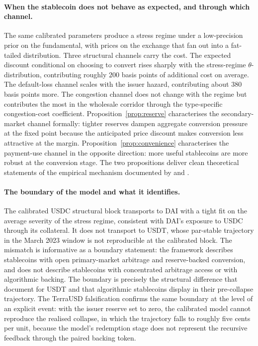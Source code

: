 \paragraph{When the stablecoin does not behave as expected, and through which channel.} The same calibrated parameters produce a stress regime under a low-precision prior on the fundamental, with prices on the exchange that fan out into a fat-tailed distribution. Three structural channels carry the cost. The expected discount conditional on choosing to convert rises sharply with the stress-regime $\theta$-distribution, contributing roughly $200$ basis points of additional cost on average. The default-loss channel scales with the issuer hazard, contributing about $380$ basis points more. The congestion channel does not change with the regime but contributes the most in the wholesale corridor through the type-specific congestion-cost coefficient. Proposition~\ref{prop:reserve} characterises the secondary-market channel formally: tighter reserves dampen aggregate conversion pressure at the fixed point because the anticipated price discount makes conversion less attractive at the margin. Proposition~\ref{prop:convenience} characterises the payment-use channel in the opposite direction: more useful stablecoins are more robust at the conversion stage. The two propositions deliver clean theoretical statements of the empirical mechanism documented by \citet{ma_zeng_zhang_2025} and \citet{bertsch_2025_adoption_fragility}.

\paragraph{The boundary of the model and what it identifies.} The calibrated USDC structural block transports to DAI with a tight fit on the average severity of the stress regime, consistent with DAI's exposure to USDC through its collateral. It does not transport to USDT, whose par-stable trajectory in the March 2023 window is not reproducible at the calibrated block. The mismatch is informative as a boundary statement: the framework describes stablecoins with open primary-market arbitrage and reserve-backed conversion, and does not describe stablecoins with concentrated arbitrage access or with algorithmic backing. The boundary is precisely the structural difference that \citet{ma_zeng_zhang_2025} document for USDT and that algorithmic stablecoins display in their pre-collapse trajectory. The TerraUSD falsification confirms the same boundary at the level of an explicit event: with the issuer reserve set to zero, the calibrated model cannot reproduce the realised collapse, in which the trajectory falls to roughly five cents per unit, because the model's redemption stage does not represent the recursive feedback through the paired backing token.

